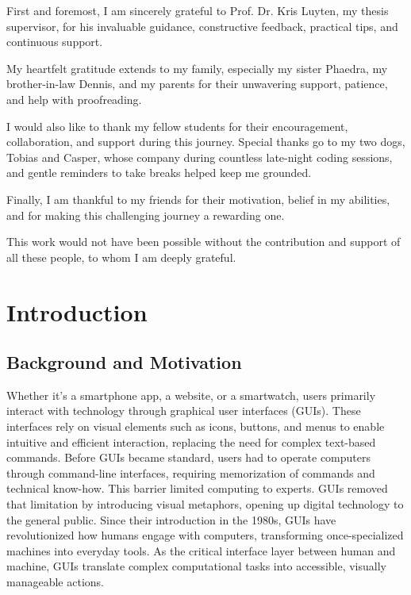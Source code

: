\documentclass[openany]{book}
\begin{document}
First and foremost, I am sincerely grateful to Prof. Dr. Kris Luyten, my thesis supervisor, for his invaluable guidance, constructive feedback, practical tips, and continuous support.

My heartfelt gratitude extends to my family, especially my sister Phaedra, my brother-in-law Dennis, and my parents for their unwavering support, patience, and help with proofreading.

I would also like to thank my fellow students for their encouragement, collaboration, and support during this journey. Special thanks go to my two dogs, Tobias and Casper, whose company during countless late-night coding sessions, and gentle reminders to take breaks helped keep me grounded.

Finally, I am thankful to my friends for their motivation, belief in my abilities, and for making this challenging journey a rewarding one.

This work would not have been possible without the contribution and support of all these people, to whom I am deeply grateful.

\tableofcontents
\listoffigures
\listoftables
\glsaddall
\printglossary[type=\acronymtype, title=List of Abbreviations]

\chapter{Introduction}
\section{Background and Motivation}
Whether it's a smartphone app, a website, or a smartwatch, users primarily interact with technology through graphical user interfaces (GUIs). These interfaces rely on visual elements such as icons, buttons, and menus to enable intuitive and efficient interaction, replacing the need for complex text-based commands.
Before GUIs became standard, users had to operate computers through command-line interfaces, requiring memorization of commands and technical know-how. This barrier limited computing to experts. GUIs removed that limitation by introducing visual metaphors, opening up digital technology to the general public.
Since their introduction in the 1980s, GUIs have revolutionized how humans engage with computers, transforming once-specialized machines into everyday tools. As the critical interface layer between human and machine, GUIs translate complex computational tasks into accessible, visually manageable actions.
\end{document}
